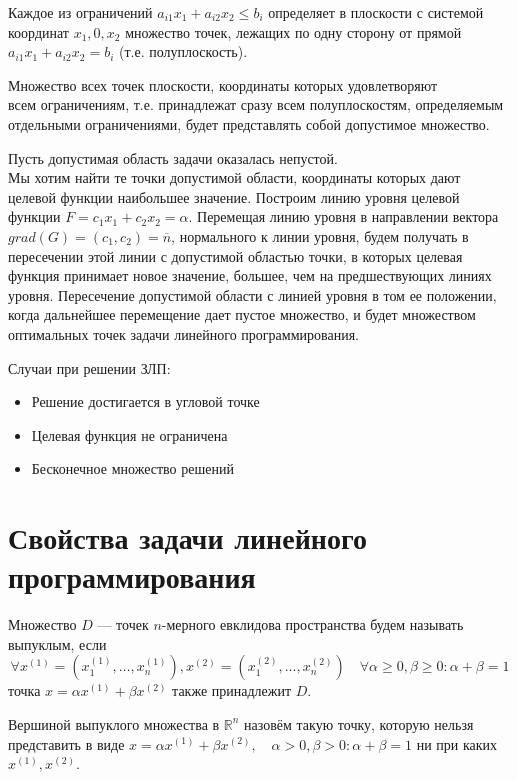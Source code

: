 \documentclass[17pt]{extarticle}
\begin{document}
Каждое из ограничений \( a_{i1} x_1 + a_{i2} x_2 \leq b_i \) определяет в плоскости с системой координат \( x_1, 0, x_2 \) множество точек,
лежащих по одну сторону от прямой \( a_{i1} x_1 + a_{i2} x_2 = b_i \) (т.е. полуплоскость).

Множество всех точек плоскости, координаты которых удовлетворяют \\ всем ограничениям, т.е. принадлежат сразу всем полуплоскостям,
определяемым отдельными ограничениями, будет представлять собой допустимое множество.

Пусть допустимая область задачи оказалась непустой. \\
Мы хотим найти те точки допустимой области, координаты которых дают
целевой функции наибольшее значение.
Построим линию уровня целевой функции $F = c_1 x_1 + c_2 x_2 = \alpha$.
Перемещая линию уровня в направлении вектора $grad(G)=(c_1, c_2)=\overline{n}$,
нормального к линии уровня, будем получать в пересечении этой линии
с допустимой областью точки, в которых целевая функция принимает
новое значение, большее, чем на предшествующих линиях уровня.
Пересечение допустимой области с линией уровня в том ее положении,
когда дальнейшее перемещение дает пустое множество, и будет
множеством оптимальных точек задачи линейного программирования.

Случаи при решении ЗЛП:
\begin{itemize}
    \item Решение достигается в угловой точке
    \item Целевая функция не ограничена
    \item Бесконечное множество решений
\end{itemize}


\section{Свойства задачи линейного \\ программирования}

\begin{definition}
    Множество \( D \) — точек \( n \)-мерного евклидова пространства будем называть выпуклым, если
    \[
        \forall x^{(1)} = (x_1^{(1)}, \ldots, x_n^{(1)}), x^{(2)} = (x_1^{(2)}, \ldots, x_n^{(2)})
        \quad \forall \alpha \geq 0, \beta \geq 0 \colon \alpha + \beta = 1
    \]
    точка \(x = \alpha x^{(1)} + \beta x^{(2)}\) также принадлежит \( D \).
\end{definition}

\begin{definition}
    Вершиной выпуклого множества в \( \mathbb{R}^n \) назовём такую точку, которую нельзя представить в виде
    \(
    x = \alpha x^{(1)} + \beta x^{(2)}, \quad \alpha > 0, \beta > 0 \colon \alpha + \beta = 1
    \)
    ни при каких \(x^{(1)}, x^{(2)}\).
\end{definition}
\end{document}
